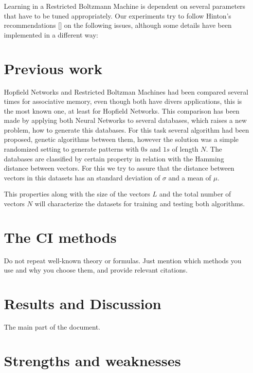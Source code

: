 \documentclass[anon]{CI}
\begin{document}
Learning in a Restricted Boltzmann Machine is dependent on several parameters that have to be tuned appropriately. Our experiments try to follow Hinton’s recommendations [\cite{Hinton2012}] on the following issues, although some details have been implemented in a different way:





\section{Previous work}

Hopfield Networks and Restricted Boltzman Machines had been compared several times for associative memory, even though both have divers applications, this is the most known one, at least for Hopfield Networks. This comparison has been made by applying both Neural Networks to several databases, which raises a new problem, how to generate this databases. For this task several algorithm had been proposed, genetic algorithms between them, however the solution was a simple randomized setting to generate patterns with $ 0s $ and $ 1s $ of length $N$. The databases are classified by certain property in relation with the Hamming distance between vectors. For this we try to assure that the distance between vectors in this datasets has an standard deviation of $\sigma$ and a mean of $\mu$. 

This properties along with the size of the vectors $L$ and the total number of vectors $N$ will characterize the datasets for training and testing both algorithms.

\section{The CI methods}

Do not repeat well-known theory or formulas. Just mention which methods you use and why you choose them, and provide relevant citations. 

\section{Results and Discussion}

The main part of the document.

\section{Strengths and weaknesses}
\end{document}
